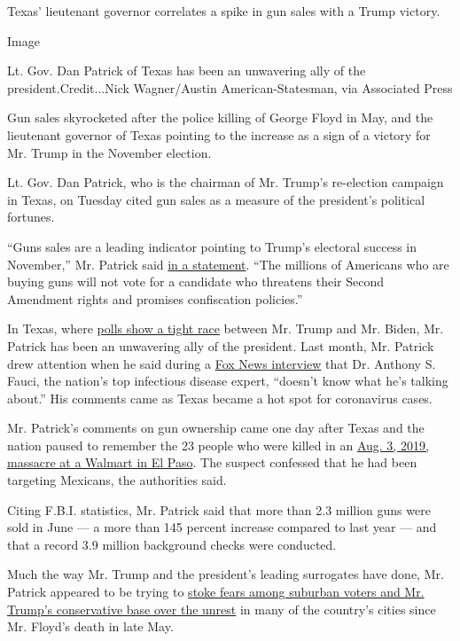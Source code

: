 Texas' lieutenant governor correlates a spike in gun sales with a Trump
victory.

Image

Lt. Gov. Dan Patrick of Texas has been an unwavering ally of the
president.Credit...Nick Wagner/Austin American-Statesman, via Associated
Press

Gun sales skyrocketed after the police killing of George Floyd in May,
and the lieutenant governor of Texas pointing to the increase as a sign
of a victory for Mr. Trump in the November election.

Lt. Gov. Dan Patrick, who is the chairman of Mr. Trump's re-election
campaign in Texas, on Tuesday cited gun sales as a measure of the
president's political fortunes.

``Guns sales are a leading indicator pointing to Trump's electoral
success in November,'' Mr. Patrick said
\href{https://www.scribd.com/document/471381594/PR-20-08-04}{in a
statement}. ``The millions of Americans who are buying guns will not
vote for a candidate who threatens their Second Amendment rights and
promises confiscation policies.''

In Texas, where
\href{https://projects.fivethirtyeight.com/polls/texas/}{polls show a
tight race} between Mr. Trump and Mr. Biden, Mr. Patrick has been an
unwavering ally of the president. Last month, Mr. Patrick drew attention
when he said during a
\href{https://video.foxnews.com/v/6168445167001\#sp=show-clips}{Fox News
interview} that Dr. Anthony S. Fauci, the nation's top infectious
disease expert, ``doesn't know what he's talking about.'' His comments
came as Texas became a hot spot for coronavirus cases.

Mr. Patrick's comments on gun ownership came one day after Texas and the
nation paused to remember the 23 people who were killed in an
\href{https://www.nytimes3xbfgragh.onion/2019/08/09/us/el-paso-suspect-confession.html}{Aug.
3, 2019, massacre at a Walmart in El Paso}. The suspect confessed that
he had been targeting Mexicans, the authorities said.

Citing F.B.I. statistics, Mr. Patrick said that more than 2.3 million
guns were sold in June --- a more than 145 percent increase compared to
last year --- and that a record 3.9 million background checks were
conducted.

Much the way Mr. Trump and the president's leading surrogates have done,
Mr. Patrick appeared to be trying to
\href{https://www.nytimes3xbfgragh.onion/2020/07/30/upshot/trump-suburban-voters.html}{stoke
fears among suburban voters and Mr. Trump's conservative base over the
unrest} in many of the country's cities since Mr. Floyd's death in late
May.

